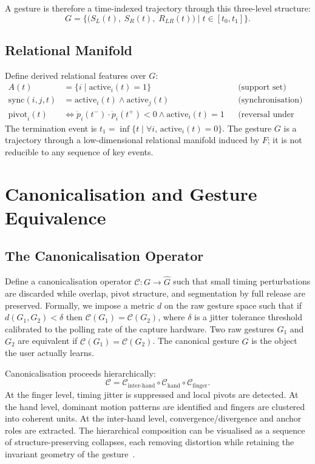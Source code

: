 \documentclass[11pt, a4paper]{article}
\begin{document}
A gesture is therefore a time-indexed trajectory through this
three-level structure:
\[
  G = \bigl\{\bigl(S_L(t),\; S_R(t),\; R_{LR}(t)\bigr) \mid t \in [t_0, t_1]\bigr\}.
\]

\subsection{Relational Manifold}

Define derived relational features over $G$:
\begin{align*}
  A(t) &= \{i \mid \mathrm{active}_i(t) = 1\} && \text{(support set)}\\
  \mathrm{sync}(i,j,t) &= \mathrm{active}_i(t) \wedge \mathrm{active}_j(t) && \text{(synchronisation)}\\
  \mathrm{pivot}_i(t) &\iff \dot{p}_i(t^-)\cdot\dot{p}_i(t^+) < 0
    \wedge \mathrm{active}_i(t)=1 && \text{(reversal under contact)}
\end{align*}
The termination event is $t_1 = \inf\{t \mid \forall i,\,
\mathrm{active}_i(t) = 0\}$. The gesture $G$ is a trajectory through a
low-dimensional relational manifold induced by $F$; it is not reducible
to any sequence of key events.

\section{Canonicalisation and Gesture Equivalence}

\subsection{The Canonicalisation Operator}

Define a canonicalisation operator $\mathcal{C}: G \to \hat{G}$ such
that small timing perturbations are discarded while overlap, pivot
structure, and segmentation by full release are preserved. Formally, we
impose a metric $d$ on the raw gesture space such that if
$d(G_1, G_2) < \delta$ then $\mathcal{C}(G_1) = \mathcal{C}(G_2)$, where
$\delta$ is a jitter tolerance threshold calibrated to the polling rate of
the capture hardware. Two raw gestures $G_1$ and $G_2$ are equivalent if
$\mathcal{C}(G_1) = \mathcal{C}(G_2)$. The canonical gesture $\hat{G}$
is the object the user actually learns.

Canonicalisation proceeds hierarchically:
\[
  \mathcal{C} = \mathcal{C}_{\mathrm{inter\text{-}hand}} \circ
                \mathcal{C}_{\mathrm{hand}} \circ
                \mathcal{C}_{\mathrm{finger}}.
\]
At the finger level, timing jitter is suppressed and local pivots are
detected. At the hand level, dominant motion patterns are identified and
fingers are clustered into coherent units. At the inter-hand level,
convergence/divergence and anchor roles are extracted. The hierarchical
composition can be visualised as a sequence of structure-preserving
collapses, each removing distortion while retaining the invariant
geometry of the gesture~\cite{needham1997}.
\end{document}
